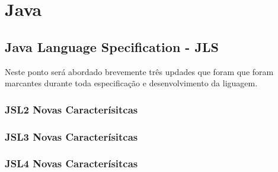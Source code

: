 \chapter{Java}
\section{Java Language Specification - JLS}
Neste ponto será abordado brevemente três updades que foram que foram marcantes durante toda especificação e desenvolvimento da liguagem.

\subsection{JSL2 Novas Caracterísitcas}


\subsection{JSL3 Novas Caracterísitcas}

\subsection{JSL4 Novas Caracterísitcas}